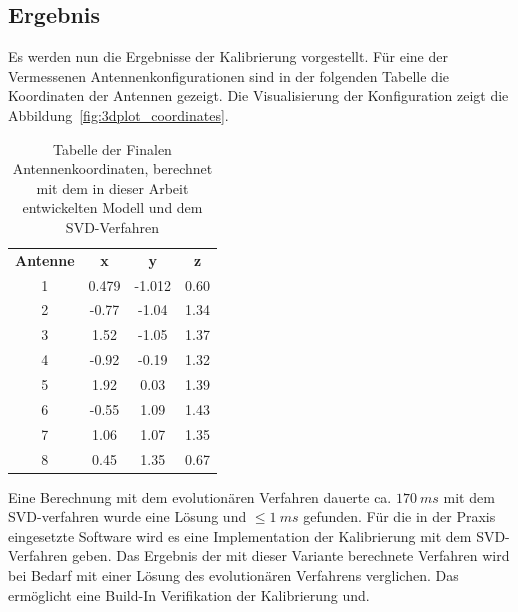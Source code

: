 \subsection{Ergebnis}
Es werden nun die Ergebnisse der Kalibrierung vorgestellt. Für eine der Vermessenen Antennenkonfigurationen sind in der folgenden Tabelle die Koordinaten der Antennen gezeigt. Die Visualisierung der Konfiguration zeigt die Abbildung~\ref{fig:3dplot_coordinates}.
%
\begin{table} [h]
	\begin{center}
		\begin{tabular}{cccc}
		      \textbf{Antenne} & \textbf{x} & \textbf{y} & \textbf{z} \\
		      1 &	0.479	&	-1.012 & 0.60 \\
		      2 &	-0.77 	&	-1.04 & 1.34 \\
		      3 &	1.52  	&	-1.05 & 1.37 \\
		      4 &	-0.92 	&	-0.19 & 1.32 \\
		      5 &	1.92 	&	0.03 & 1.39 \\
		      6 &	-0.55 	&	1.09 & 1.43 \\
		      7 &	1.06 	&	1.07 & 1.35 \\
		      8 &	0.45 	&	1.35 & 0.67 \\
		\end{tabular}
		\caption[Finale Antennen Koordinaten]{Tabelle der Finalen Antennenkoordinaten, berechnet mit dem in dieser Arbeit entwickelten Modell und dem SVD-Verfahren}
		\label{tab:FinalCoords}
	\end{center}
\end{table}
%
Eine Berechnung mit dem evolutionären Verfahren dauerte ca. $170~ms$ mit dem SVD-verfahren wurde eine Lösung und $\le 1~ms$ gefunden. Für die in der Praxis eingesetzte Software wird es eine Implementation der Kalibrierung mit dem SVD-Verfahren geben. Das Ergebnis der mit dieser Variante berechnete Verfahren wird bei Bedarf mit einer Lösung des evolutionären Verfahrens verglichen. Das ermöglicht eine Build-In Verifikation der Kalibrierung  und.
%
